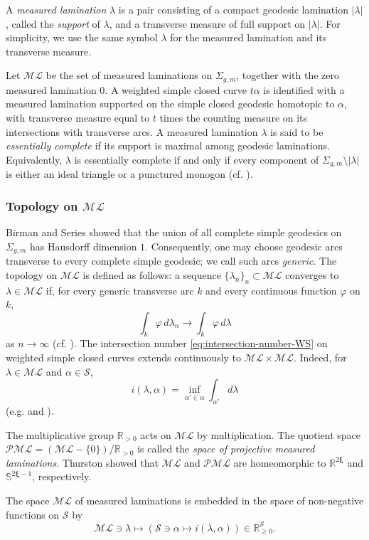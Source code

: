 \documentclass[dvipdfmx]{amsart}
\theoremstyle{remark}
\newcommand{\convgenus}{{\boldsymbol \xi}}
\newcommand{\ml}{\mathcal{ML}}
\newcommand{\pml}{\mathcal{PML}}
\begin{document}
A \emph{measured lamination} $\lambda$ is a pair consisting of a compact geodesic lamination $|\lambda|$, called the \emph{support} of $\lambda$, and a transverse measure of full support on $|\lambda|$.
For simplicity, we use the same symbol $\lambda$ for the measured lamination and its transverse measure.

Let $\ml$ be the set of measured laminations on $\Sigma_{g,m}$, together with the zero measured lamination $0$.
A weighted simple closed curve $t\alpha$ is identified with
a measured lamination supported on the simple closed geodesic homotopic to $\alpha$, with transverse measure equal to $t$ times the counting measure on its intersections with transverse arcs. A measured lamination $\lambda$ is said to be \emph{essentially complete} if its support is maximal among geodesic laminations. Equivalently, $\lambda$ is essentially complete if and only if every component of $\Sigma_{g,m}\setminus |\lambda|$ is either an ideal triangle or a punctured monogon (cf. \cite[\S9.5]{Thurston-LectureNote}).

\subsubsection{Topology on $\ml$}
Birman and Series \cite{BirmanSeries1985} showed that the union of all complete simple geodesics on $\Sigma_{g,m}$ has Hausdorff dimension $1$.
Consequently, one may choose geodesic arcs transverse to every complete simple geodesic; we call such arcs \emph{generic}.
The topology on $\ml$ is defined as follows:
a sequence $\{\lambda_n\}_n\subset \ml$ converges to $\lambda\in \ml$ if, for every generic transverse arc $k$ and every continuous function $\varphi$ on $k$,
\[
\int_k \varphi\,d\lambda_n\to \int_k\varphi\,d\lambda
\]
as $n\to \infty$ (cf. \cite[Part II]{Bonahon2001}).
The intersection number \eqref{eq:intersection-number-WS}
on weighted simple closed curves extends continuously to $\ml\times \ml$.
Indeed, for $\lambda\in \ml$ and $\alpha\in \mathcal{S}$,
\[
i(\lambda,\alpha)=\inf_{\alpha'\in \alpha}\int_{\alpha'}d\lambda
\]
(e.g. \cite{Bonahon2001} and \cite{Thurston-LectureNote}).

The multiplicative group $\mathbb{R}_{>0}$ acts on $\ml$ by multiplication. The quotient space $\pml=(\ml-\{0\})/\mathbb{R}_{>0}$ is called the \emph{space of projective measured laminations}.
Thurston showed that $\ml$ and $\pml$ are homeomorphic to $\mathbb{R}^{2\convgenus}$ and $\mathbb{S}^{2\convgenus-1}$, respectively.

The space $\ml$ of measured laminations is embedded in the space of non-negative functions on $\mathcal{S}$ by
\begin{equation}
\label{eq:ml-emb}
\ml\ni \lambda\mapsto (\mathcal{S}\ni \alpha\mapsto i(\lambda,\alpha))\in \mathbb{R}_{\ge 0}^{\mathcal{S}}.
\end{equation}
\end{document}
